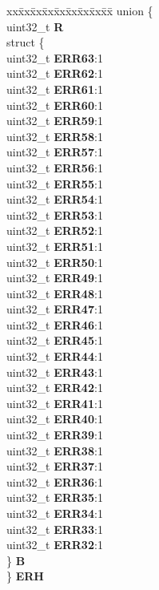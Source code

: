 \begin{DoxyCompactItemize}
\begin{tabbing}
\end{tabbing}\item 
\mbox{\label{structEDMA__tag_ac4afb34d444031c019311b7eda069f58}} 
\begin{tabbing}
xx\=xx\=xx\=xx\=xx\=xx\=xx\=xx\=xx\=\kill
union \{\\
\>uint32\_t {\bfseries R}\\
\>struct \{\\
\>\>uint32\_t {\bfseries ERR63}:1\\
\>\>uint32\_t {\bfseries ERR62}:1\\
\>\>uint32\_t {\bfseries ERR61}:1\\
\>\>uint32\_t {\bfseries ERR60}:1\\
\>\>uint32\_t {\bfseries ERR59}:1\\
\>\>uint32\_t {\bfseries ERR58}:1\\
\>\>uint32\_t {\bfseries ERR57}:1\\
\>\>uint32\_t {\bfseries ERR56}:1\\
\>\>uint32\_t {\bfseries ERR55}:1\\
\>\>uint32\_t {\bfseries ERR54}:1\\
\>\>uint32\_t {\bfseries ERR53}:1\\
\>\>uint32\_t {\bfseries ERR52}:1\\
\>\>uint32\_t {\bfseries ERR51}:1\\
\>\>uint32\_t {\bfseries ERR50}:1\\
\>\>uint32\_t {\bfseries ERR49}:1\\
\>\>uint32\_t {\bfseries ERR48}:1\\
\>\>uint32\_t {\bfseries ERR47}:1\\
\>\>uint32\_t {\bfseries ERR46}:1\\
\>\>uint32\_t {\bfseries ERR45}:1\\
\>\>uint32\_t {\bfseries ERR44}:1\\
\>\>uint32\_t {\bfseries ERR43}:1\\
\>\>uint32\_t {\bfseries ERR42}:1\\
\>\>uint32\_t {\bfseries ERR41}:1\\
\>\>uint32\_t {\bfseries ERR40}:1\\
\>\>uint32\_t {\bfseries ERR39}:1\\
\>\>uint32\_t {\bfseries ERR38}:1\\
\>\>uint32\_t {\bfseries ERR37}:1\\
\>\>uint32\_t {\bfseries ERR36}:1\\
\>\>uint32\_t {\bfseries ERR35}:1\\
\>\>uint32\_t {\bfseries ERR34}:1\\
\>\>uint32\_t {\bfseries ERR33}:1\\
\>\>uint32\_t {\bfseries ERR32}:1\\
\>\} {\bfseries B}\\
\} {\bfseries ERH}\\


\end{tabbing}
\end{DoxyCompactItemize}
